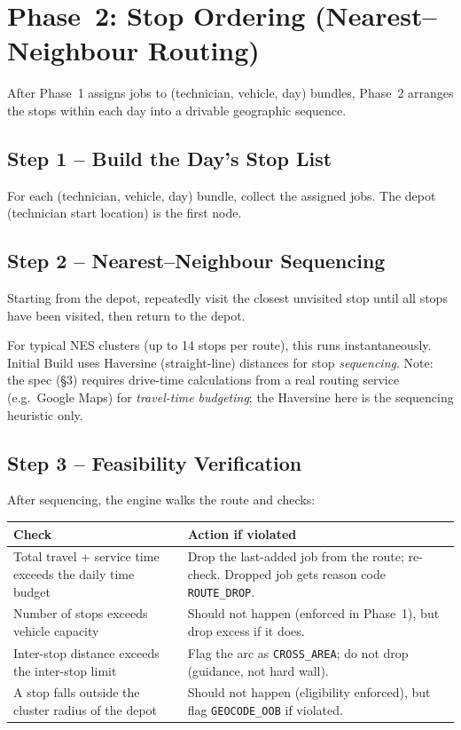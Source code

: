\documentclass[12pt]{article}
\begin{document}
\section*{Phase~2: Stop Ordering (Nearest--Neighbour Routing)}
\label{sec:routing}

After Phase~1 assigns jobs to (technician, vehicle, day) bundles, Phase~2 arranges the stops within each day into a drivable geographic sequence.

\subsection*{Step 1 -- Build the Day's Stop List}

For each (technician, vehicle, day) bundle, collect the assigned jobs.
The depot (technician start location) is the first node.

\subsection*{Step 2 -- Nearest--Neighbour Sequencing}

Starting from the depot, repeatedly visit the closest unvisited stop until all stops have been visited, then return to the depot.

For typical NES clusters (up to 14 stops per route), this runs instantaneously.
Initial Build uses Haversine (straight-line) distances for stop \emph{sequencing}.
Note: the spec (\S3) requires drive-time calculations from a real routing service (e.g.\ Google Maps) for \emph{travel-time budgeting}; the Haversine here is the sequencing heuristic only.

\subsection*{Step 3 -- Feasibility Verification}

After sequencing, the engine walks the route and checks:

\medskip
{\small
\begin{longtable}{lp{9cm}}
\toprule
\textbf{Check} & \textbf{Action if violated} \\
\midrule
Total travel + service time exceeds the daily time budget & Drop the last-added job from the route; re-check.  Dropped job gets reason code \texttt{ROUTE\_DROP}. \\
Number of stops exceeds vehicle capacity & Should not happen (enforced in Phase~1), but drop excess if it does. \\
Inter-stop distance exceeds the inter-stop limit & Flag the arc as \texttt{CROSS\_AREA}; do not drop (guidance, not hard wall). \\
A stop falls outside the cluster radius of the depot & Should not happen (eligibility enforced), but flag \texttt{GEOCODE\_OOB} if violated. \\
\bottomrule
\end{longtable}
}
\end{document}
